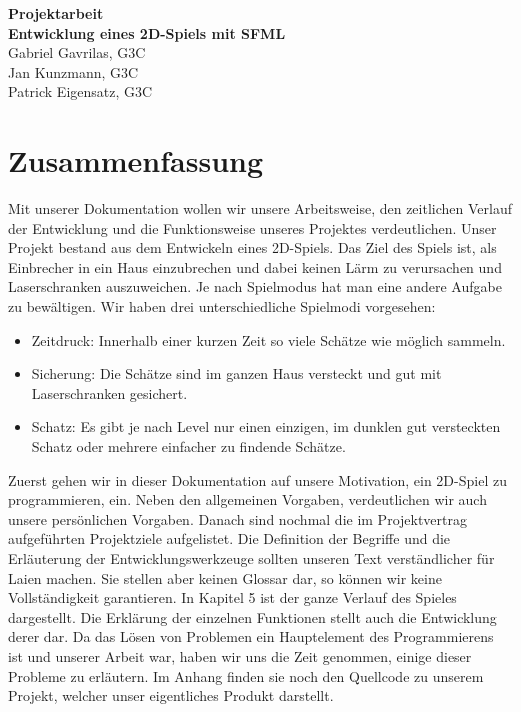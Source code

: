 \documentclass[11pt,a4paper]{scrbook}
\begin{document}
\begin{titlepage}
\begin{center}

\vspace*{3cm}
\textbf{\huge{Projektarbeit}}\\
\vspace*{2cm}
\textbf{\large{Entwicklung eines 2D-Spiels mit SFML}}\\
\vspace*{5cm}
Gabriel Gavrilas, G3C\\
Jan Kunzmann, G3C\\
Patrick Eigensatz, G3C
\end{center}
\end{titlepage}


\clearpage
\thispagestyle{empty}
\clearpage\mbox{}\clearpage

\section*{Zusammenfassung}
Mit unserer Dokumentation wollen wir unsere Arbeitsweise, den zeitlichen Verlauf der Entwicklung und die Funktionsweise unseres Projektes verdeutlichen.
Unser Projekt bestand aus dem Entwickeln eines 2D-Spiels.
Das Ziel des Spiels ist, als Einbrecher in ein Haus einzubrechen und dabei keinen Lärm zu verursachen und Laserschranken auszuweichen. Je nach Spielmodus hat man eine andere Aufgabe zu bewältigen.
Wir haben drei unterschiedliche Spielmodi vorgesehen:
\begin{itemize}
\item Zeitdruck: Innerhalb einer kurzen Zeit so viele Schätze wie möglich sammeln.
\item Sicherung: Die Schätze sind im ganzen Haus versteckt und gut mit Laserschranken gesichert.
\item Schatz: Es gibt je nach Level nur einen einzigen, im dunklen gut versteckten Schatz oder mehrere einfacher zu findende Schätze.
\end{itemize}
Zuerst gehen wir in dieser Dokumentation auf unsere Motivation, ein 2D-Spiel zu programmieren, ein.
Neben den allgemeinen Vorgaben, verdeutlichen wir auch unsere persönlichen Vorgaben.
Danach sind nochmal die im Projektvertrag aufgeführten Projektziele aufgelistet.
Die Definition der Begriffe und die Erläuterung der Entwicklungswerkzeuge sollten unseren Text verständlicher für Laien machen.
Sie stellen aber keinen Glossar dar, so können wir keine Vollständigkeit garantieren.
In Kapitel 5 ist der ganze Verlauf des Spieles dargestellt.
Die Erklärung der einzelnen Funktionen stellt auch die Entwicklung derer dar.
Da das Lösen von Problemen ein Hauptelement des Programmierens ist und unserer Arbeit war, haben wir uns die Zeit genommen, einige dieser Probleme zu erläutern.
Im Anhang finden sie noch den Quellcode zu unserem Projekt, welcher unser eigentliches Produkt darstellt.
\end{document}
